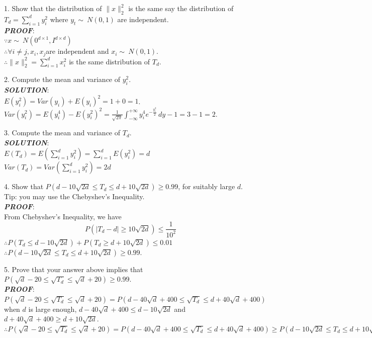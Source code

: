 \documentclass{article}
\theoremstyle{definition}
\theoremstyle{definition}
\theoremstyle{remark}
\begin{document}
1. Show that the distribution of $\lVert x \rVert_2^2$ is the same say the distribution of $T_d=\sum_{i=1}^d y_i^2$ where $y_t\sim ~N(0,1)$ are independent.\\
\emph{\textbf{PROOF}}:\\
$\because x\sim ~N(0^{d\times 1}, I^{d\times d})$\\
$\therefore \forall i\neq j, x_i,x_j$are independent and $x_i\sim ~N(0,1).$\\
$\therefore \lVert x \rVert_2^2 = \sum_{i=1}^d x_i^2$ is the same distribution of $T_d$.

2. Compute the mean and variance of $y_i^2$.\\
\emph{\textbf{SOLUTION}}:\\
$E(y_i^2) = Var(y_i)+E(y_i)^2 = 1 + 0 = 1$.\\
$Var(y_i^2) = E(y_i^4)-E(y_i^2)^2 = \frac{1}{\sqrt{2\pi}}\int_{-\infty}^{+\infty}y_i^4 e^{-\frac{y_i^2}{2}}\,dy - 1 =  3 - 1 = 2.$

3. Compute the mean and variance of $T_d$.\\
\emph{\textbf{SOLUTION}}:\\
$E(T_d)=E(\sum_{i=1}^d y_i^2) = \sum_{i=1}^d E(y_i^2)=d$ \\
$Var(T_d)=Var(\sum_{i=1}^d y_i^2)=2d$

4. Show that $P(d-10\sqrt{2d}\leq T_d \leq d+10\sqrt{2d})\geq 0.99$, for suitably large $d$. Tip: you may use the Chebyshev's Inequality.\\
\emph{\textbf{PROOF}}:\\
From Chebyshev's Inequality, we have
\[ P(|T_d-d|\geq10\sqrt{2d})\leq\frac{1}{10^2}\]
$\therefore P(T_d \leq d-10\sqrt{2d})+P(T_d \geq d+10\sqrt{2d})\leq0.01$\\
$\therefore P(d-10\sqrt{2d}\leq T_d \leq d+10\sqrt{2d})\geq 0.99$.

5. Prove that your answer above implies that $P(\sqrt d - 20 \leq \sqrt{T_d} \leq \sqrt d + 20)\geq 0.99$.\\
\emph{\textbf{PROOF}}:\\
$P(\sqrt d - 20 \leq \sqrt{T_d} \leq \sqrt d + 20) = P(d - 40\sqrt d+400\leq \sqrt{T_d} \leq  d + 40\sqrt d +400) $\\
when $d$ is large enough, $d - 40\sqrt d+400\leq d-10\sqrt{2d}$ and $d + 40\sqrt d +400\geq d+10\sqrt{2d}$.\\
$\therefore P(\sqrt d - 20 \leq \sqrt{T_d} \leq \sqrt d + 20) = P(d - 40\sqrt d+400\leq \sqrt{T_d} \leq  d + 40\sqrt d +400) \geq P(d-10\sqrt{2d}\leq T_d \leq d+10\sqrt{2d})\geq 0.99.$
\end{document}

